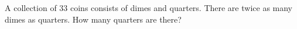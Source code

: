A collection of $33$ coins consists of dimes and quarters. There are twice as many dimes as quarters. How many quarters are there?
